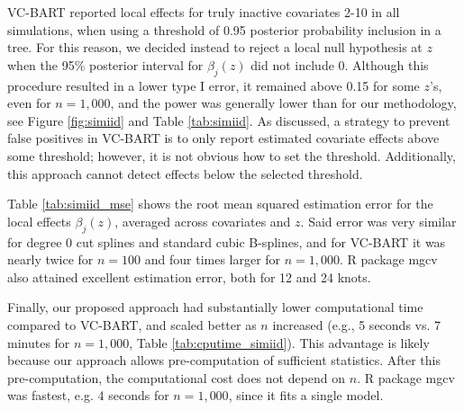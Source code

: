 VC-BART reported local effects for truly inactive covariates 2-10 in all simulations, when using a threshold of 0.95 posterior probability inclusion in a tree. For this reason, we decided instead  to reject a local null hypothesis at $z$ when the 95\% posterior interval for $\beta_j(z)$ did not include 0.   Although this procedure resulted in a lower type I error, it remained above 0.15 for some $z$'s, even for $n=1,000$, and the power was generally lower than for our methodology, see Figure \ref{fig:simiid} and Table \ref{tab:simiid}.
As discussed, a strategy to prevent false positives in VC-BART is to only report estimated covariate effects above some threshold; however,  it is not obvious how to set the threshold. Additionally, this approach cannot detect effects below the selected threshold. %

Table \ref{tab:simiid_mse} shows the root mean squared estimation error for the local effects $\beta_j(z)$, averaged across covariates and $z$. Said error  was very similar for degree 0 cut splines and standard cubic B-splines, and for VC-BART it was nearly twice for $n=100$ and four times larger for $n=1,000$. %
 R package mgcv also attained excellent estimation error, both for 12 and 24 knots. 

Finally, our proposed approach had substantially lower computational time compared to VC-BART, and scaled better as $n$ increased (e.g.,  5 seconds vs. 7 minutes  for $n=1,000$, Table \ref{tab:cputime_simiid}). %
This advantage is likely because our approach allows pre-computation of sufficient statistics. After this pre-computation, the computational cost does not depend on $n$.
 R package mgcv was fastest, e.g. 4 seconds for $n=1,000$, since it fits a single model. 




